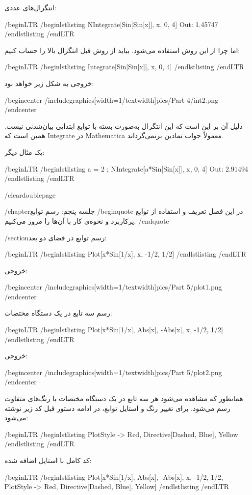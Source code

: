 انتگرال‌های عددی:

/begin{LTR}
/begin{lstlisting}
NIntegrate[Sin[Sin[x]], {x, 0, 4}]        Out: 1.45747
/end{lstlisting}
/end{LTR}

اما چرا از این روش استفاده می‌شود. بیاید از روش قبل انتگرال بالا را حساب کنیم:

/begin{LTR}
/begin{lstlisting}
Integrate[Sin[Sin[x]], {x, 0, 4}]
/end{lstlisting}
/end{LTR}

خروجی به شکل زیر خواهد بود:

/begin{center}
/includegraphics[width=1/textwidth]{pics/Part 4/int2.png}
/end{center}

دلیل آن بر این است که این انتگرال به‌صورت بسته با توابع ابتدایی بیان‌شدنی نیست. همین است که Integrate در Mathematica معمولاً جواب نمادین برنمی‌گرداند.

یک مثال دیگر:

/begin{LTR}
/begin{lstlisting}
a = 2 ;
NIntegrate[a*Sin[Sin[x]], {x, 0, 4}]                       Out: 2.91494
/end{lstlisting}
/end{LTR}

/cleardoublepage

/chapter{جلسه پنجم: رسم توابع}
/begin{quote}
در این فصل تعریف و استفاده از توابع پرکاربرد و نحوه‌ی کار با آن‌ها را مرور می‌کنیم.
/end{quote}


/section{رسم توابع در فضای دو بعد:}

/begin{LTR}
/begin{lstlisting}
Plot[x*Sin[1/x], {x, -1/2, 1/2}]
/end{lstlisting}
/end{LTR}

خروجی:

/begin{center}
/includegraphics[width=1/textwidth]{pics/Part 5/plot1.png}
/end{center}

رسم سه تابع در یک دستگاه مختصات:

/begin{LTR}
/begin{lstlisting}
Plot[{x*Sin[1/x], Abs[x], -Abs[x]}, {x, -1/2, 1/2}]
/end{lstlisting}
/end{LTR}

خروجی:

/begin{center}
/includegraphics[width=1/textwidth]{pics/Part 5/plot2.png}
/end{center}

همانطور که مشاهده می‌شود هر سه تابع در یک دستگاه مختصات با رنگ‌های متفاوت رسم می‌شود. برای تغییر رنگ  و استایل توابع، در ادامه دستور قبل کد زیر نوشته می‌شود:

/begin{LTR}
/begin{lstlisting}
PlotStyle -> { Red, Directive[Dashed, Blue], Yellow}
/end{lstlisting}
/end{LTR}

کد کامل با استایل اضافه شده:

/begin{LTR}
/begin{lstlisting}
Plot[{x*Sin[1/x], Abs[x], -Abs[x]}, {x, -1/2, 1/2}, 
 PlotStyle -> { Red, Directive[Dashed, Blue], Yellow}]
/end{lstlisting}
/end{LTR}

